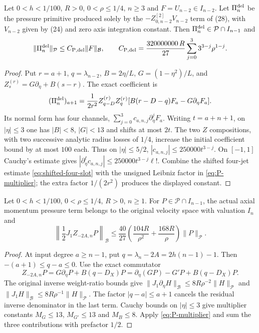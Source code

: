 \begin{theorem}
\label{thm:shifted-delayed-pressure}
Let $0<h<1/100$, $R>0$, $0<\rho\le1/4$, $n\ge3$ and
$F=U_{n-2}\in I_{n-2}$. Let $\Pi_n^{\rm del}$ be the pressure
primitive produced solely by the
$-Z_{0,n-2}^{[2]}V_{n-2}$ term of (28), with $V_{n-2}$
given by (24) and zero axis integration constant. Then
$\Pi_n^{\rm del}\in\mathcal P\cap I_{n-1}$ and
\begin{equation}\label{eq:shifted-delayed-bound}
 \|\Pi_n^{\rm del}\|_{\mathcal P}
 \le C_{\rm P,del}\|F\|_{\mathcal B},\qquad
 C_{\rm P,del}=\frac{320000000\,R}{27}
 \sum_{j=0}^{3}3^{3-j}\rho^{1-j}.
\end{equation}
\end{theorem}
\begin{proof}
Put $r=a+1$, $q=\lambda_{n-2}$,
$B=2\eta/L$, $G=(1-\eta^2)/L$, and
$Z_s^{(r)}=G\partial_\eta+B(s-r)$. The exact coefficient is
\[
 (\Pi_n^{\rm del})_{a+1}
 =\frac1{2r^2}Z_{q-D}^{(r)}Z_q^{(r)}
 [B(r-D-q)F_a-G\partial_\eta F_a].
\]
Its normal form has four channels,
$\sum_{j=0}^3c_{a,n,j}\partial_\eta^jF_a$.
Writing $t=a+n+1$, on $|\eta|\le3$ one has
$|B|<8$, $|G|<13$ and shifts at most $2t$.
The two $Z$ compositions, with two successive analytic
radius losses of $1/4$, increase the initial coefficient bound
by at most $100$ each. Thus on $|\eta|\le5/2$,
$|c_{a,n,j}|\le250000t^{3-j}$.
On $[-1,1]$ Cauchy's estimate gives
$|\partial_\eta^\ell c_{a,n,j}|
\le250000t^{3-j}\ell!$.
Combine the shifted four-jet estimate
\eqref{eq:shifted-four-slot} with the unsigned Leibniz
factor in \eqref{eq:P-multiplier}; the extra factor
$1/(2r^2)$ produces the displayed constant.
\end{proof}

\begin{theorem}
\label{thm:pressure-to-velocity}
Let $0<h<1/100$, $0<\rho\le1/4$, $R>0$, $n\ge1$.
For $P\in\mathcal P\cap I_{n-1}$, the actual axial
momentum pressure term belongs to the original velocity space
with valuation $I_n$ and
\begin{equation}\label{eq:P-to-U}
 \left\|\frac12J_1Z_{-2A,n}P\right\|_{\mathcal B}
 \le\frac{40}{27}
 \left(\frac{104R}{\rho^2}+\frac{168R}{\rho}\right)
 \|P\|_{\mathcal P}.
\end{equation}
\end{theorem}
\begin{proof}
At input degree $a\ge n-1$, put
$q=\lambda_n-2A=2h(n-1)-1$.
Then $-(a+1)\le q-a\le0$. Use the exact commutator
\[
 Z_{-2A,n}P
 =G\partial_\eta P+B(q-D_X)P
 =\partial_\eta(GP)-G'P+B(q-D_X)P.
\]
The original inverse weight-ratio bounds give
$\|J_1\partial_\eta H\|_{\mathcal B}
\le8R\rho^{-2}\|H\|_{\mathcal P}$ and
$\|J_1 H\|_{\mathcal B}
\le8R\rho^{-1}\|H\|_{\mathcal P}$.
The factor $|q-a|\le a+1$ cancels the residual inverse
denominator in the last term. Cauchy bounds on $|\eta|\le3$
give multiplier constants $M_G\le13$, $M_{G'}\le13$
and $M_B\le8$. Apply \eqref{eq:P-multiplier} and
sum the three contributions with prefactor $1/2$.
\end{proof}

